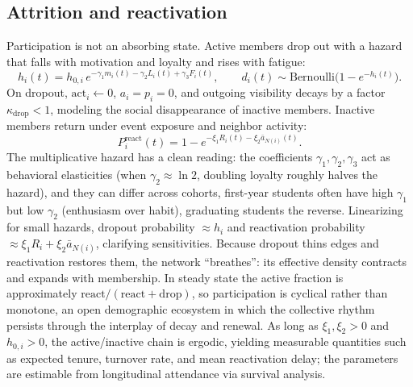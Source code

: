 \documentclass[11pt]{article}
\begin{document}
\subsection{Attrition and reactivation}\label{sec:attrition}
Participation is not an absorbing state. Active members drop out with a hazard that falls with motivation and loyalty and rises with fatigue:
\begin{equation}\tag{13}\label{eq:hazard}
h_i(t)=h_{0,i}\,e^{-\gamma_1 m_i(t)-\gamma_2 L_i(t)+\gamma_3 F_i(t)},\qquad d_i(t)\sim\mathrm{Bernoulli}\!\big(1-e^{-h_i(t)}\big).
\end{equation}
On dropout, $\mathrm{act}_i\!\leftarrow\!0$, $a_i=p_i=0$, and outgoing visibility decays by a factor $\kappa_{\mathrm{drop}}<1$, modeling the social disappearance of inactive members. Inactive members return under event exposure and neighbor activity:
\begin{equation}\tag{14}\label{eq:react}
P^{\mathrm{react}}_i(t)=1-e^{-\xi_1 R_i(t)-\xi_2\bar a_{N(i)}(t)}.
\end{equation}
The multiplicative hazard has a clean reading: the coefficients $\gamma_1,\gamma_2,\gamma_3$ act as behavioral elasticities (when $\gamma_2\approx\ln 2$, doubling loyalty roughly halves the hazard), and they can differ across cohorts, first-year students often have high $\gamma_1$ but low $\gamma_2$ (enthusiasm over habit), graduating students the reverse. Linearizing for small hazards, dropout probability $\approx h_i$ and reactivation probability $\approx\xi_1 R_i+\xi_2\bar a_{N(i)}$, clarifying sensitivities. Because dropout thins edges and reactivation restores them, the network ``breathes'': its effective density contracts and expands with membership. In steady state the active fraction is approximately $\mathrm{react}/(\mathrm{react}+\mathrm{drop})$, so participation is cyclical rather than monotone, an open demographic ecosystem in which the collective rhythm persists through the interplay of decay and renewal. As long as $\xi_1,\xi_2>0$ and $h_{0,i}>0$, the active/inactive chain is ergodic, yielding measurable quantities such as expected tenure, turnover rate, and mean reactivation delay; the parameters are estimable from longitudinal attendance via survival analysis.
\end{document}
